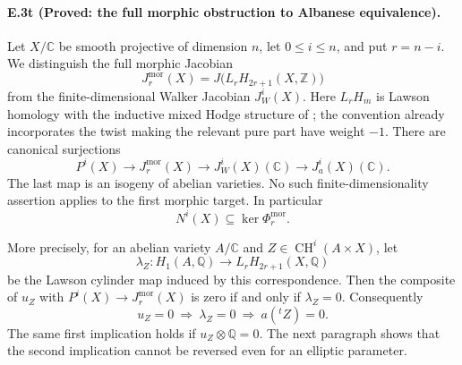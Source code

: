 \paragraph{E.3t (Proved: the full morphic obstruction to Albanese equivalence).}
Let $X/\mathbb C$ be smooth projective of dimension $n$, let
$0\le i\le n$, and put $r=n-i$. We distinguish the full
morphic Jacobian
\[
 J^{\mathrm{mor}}_r(X)
   =J\bigl(L_rH_{2r+1}(X,\mathbb Z)\bigr)
\]
from the finite-dimensional Walker Jacobian $J_W^i(X)$.
Here $L_rH_m$ is Lawson homology with the inductive mixed
Hodge structure of \citet[Sections 3--5]{cyWalker2007Morphic};
the convention already incorporates the twist making the
relevant pure part have weight $-1$. There are canonical
surjections
\[
 P^i(X)\longrightarrow J^{\mathrm{mor}}_r(X)
       \longrightarrow J_W^i(X)(\mathbb C)
       \longrightarrow J_a^i(X)(\mathbb C).
\]
The last map is an isogeny of abelian varieties. No such
finite-dimensionality assertion applies to the first
morphic target. In particular
\begin{equation}\label{eq:E3-N-killed-morphic}
        N^i(X)\subseteq\ker\Phi^{\mathrm{mor}}_r.
\end{equation}

More precisely, for an abelian variety $A/\mathbb C$ and
$Z\in\operatorname{CH}^i(A\times X)$, let
\[
 \lambda_Z:H_1(A,\mathbb Q)
           \longrightarrow L_rH_{2r+1}(X,\mathbb Q)
\]
be the Lawson cylinder map induced by this correspondence.
Then the composite of $u_Z$ with $P^i(X)\to
J^{\mathrm{mor}}_r(X)$ is zero if and only if
$\lambda_Z=0$. Consequently
\begin{equation}\label{eq:E3-Lawson-necessary}
 u_Z=0\ \Longrightarrow\ \lambda_Z=0
       \ \Longrightarrow\ a({}^tZ)=0.
\end{equation}
The same first implication holds if $u_Z\otimes\mathbb Q=0$.
The next paragraph shows that the second implication cannot
be reversed even for an elliptic parameter.

